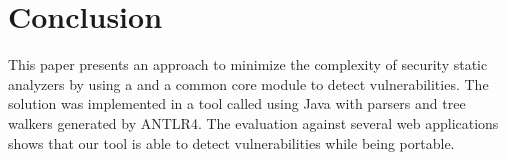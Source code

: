 \section{Conclusion}
This paper presents an approach to minimize the complexity of security static analyzers by using a \astname{} and a common core module to detect vulnerabilities. The solution was implemented in a tool called \toolname{} using Java with parsers and tree walkers generated by ANTLR4. The evaluation against several web applications shows that our tool is able to detect vulnerabilities while being portable.